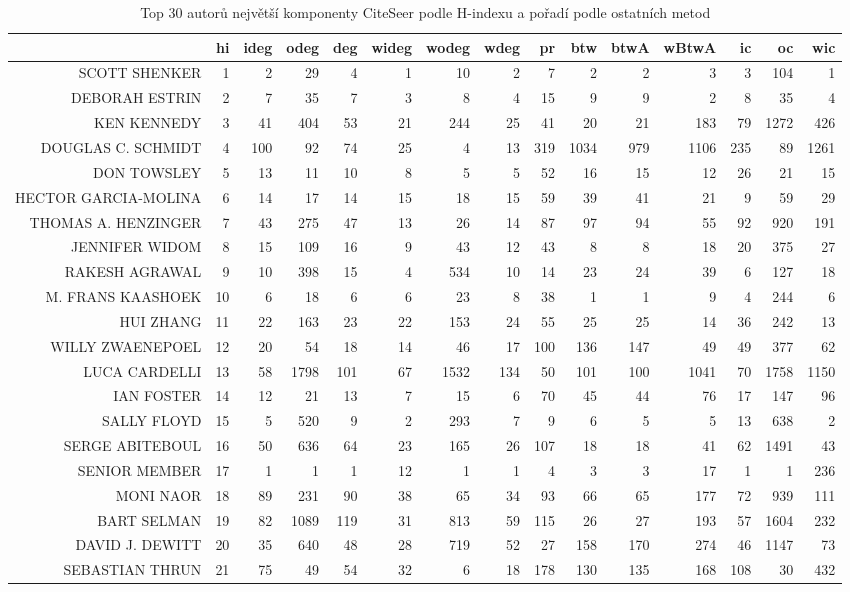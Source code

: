 \documentclass{bakalarka}
\begin{document}
\begin{table}[!ht]
\centering
\caption{Top 30 autorů největší komponenty CiteSeer podle H-indexu a pořadí podle ostatních metod}
\label{tab:ranks4}
\begin{sideways}
\begin{scriptsize}
\begin{tabular}{r|r|rrrrrrrrrrrrr}
\toprule
&hi&ideg&odeg&deg&wideg&wodeg&wdeg&pr&btw&btwA&wBtwA&ic&oc&wic\\
\midrule
SCOTT SHENKER&1&2&29&4&1&10&2&7&2&2&3&3&104&1\\
DEBORAH ESTRIN&2&7&35&7&3&8&4&15&9&9&2&8&35&4\\
KEN KENNEDY&3&41&404&53&21&244&25&41&20&21&183&79&1272&426\\
DOUGLAS C. SCHMIDT&4&100&92&74&25&4&13&319&1034&979&1106&235&89&1261\\
DON TOWSLEY&5&13&11&10&8&5&5&52&16&15&12&26&21&15\\
HECTOR GARCIA-MOLINA&6&14&17&14&15&18&15&59&39&41&21&9&59&29\\
THOMAS A. HENZINGER&7&43&275&47&13&26&14&87&97&94&55&92&920&191\\
JENNIFER WIDOM&8&15&109&16&9&43&12&43&8&8&18&20&375&27\\
RAKESH AGRAWAL&9&10&398&15&4&534&10&14&23&24&39&6&127&18\\
M. FRANS KAASHOEK&10&6&18&6&6&23&8&38&1&1&9&4&244&6\\
HUI ZHANG&11&22&163&23&22&153&24&55&25&25&14&36&242&13\\
WILLY ZWAENEPOEL&12&20&54&18&14&46&17&100&136&147&49&49&377&62\\
LUCA CARDELLI&13&58&1798&101&67&1532&134&50&101&100&1041&70&1758&1150\\
IAN FOSTER&14&12&21&13&7&15&6&70&45&44&76&17&147&96\\
SALLY FLOYD&15&5&520&9&2&293&7&9&6&5&5&13&638&2\\
SERGE ABITEBOUL&16&50&636&64&23&165&26&107&18&18&41&62&1491&43\\
SENIOR MEMBER&17&1&1&1&12&1&1&4&3&3&17&1&1&236\\
MONI NAOR&18&89&231&90&38&65&34&93&66&65&177&72&939&111\\
BART SELMAN&19&82&1089&119&31&813&59&115&26&27&193&57&1604&232\\
DAVID J. DEWITT&20&35&640&48&28&719&52&27&158&170&274&46&1147&73\\
SEBASTIAN THRUN&21&75&49&54&32&6&18&178&130&135&168&108&30&432\\

\end{tabular}
\end{scriptsize}
\end{sideways}
\end{table}
\end{document}
